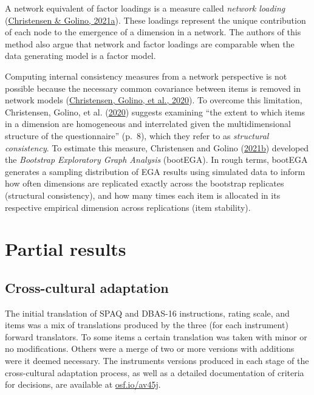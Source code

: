 \documentclass[
  ,doc,11pt, twoside,floatsintext]{apa6}
\begin{document}
A network equivalent of factor loadings is a measure called \emph{network loading} (\protect\hyperlink{ref-christensen2021}{Christensen \& Golino, 2021a}). These loadings represent the unique contribution of each node to the emergence of a dimension in a network. The authors of this method also argue that network and factor loadings are comparable when the data generating model is a factor model.

Computing internal consistency measures from a network perspective is not possible because the necessary common covariance between items is removed in network models (\protect\hyperlink{ref-christensen2020b}{Christensen, Golino, et al., 2020}). To overcome this limitation, Christensen, Golino, et al. (\protect\hyperlink{ref-christensen2020b}{2020}) suggests examining ``the extent to which items in a dimension are homogeneous and interrelated given the multidimensional structure of the questionnaire'' (p.~8), which they refer to as \emph{structural consistency}. To estimate this measure, Christensen and Golino (\protect\hyperlink{ref-christensen2021a}{2021b}) developed the \emph{Bootstrap Exploratory Graph Analysis} (bootEGA). In rough terms, bootEGA generates a sampling distribution of EGA results using simulated data to inform how often dimensions are replicated exactly across the bootstrap replicates (structural consistency), and how many times each item is allocated in its respective empirical dimension across replications (item stability).

\newpage

\hypertarget{partial-results}{%
\section{Partial results}\label{partial-results}}

\hypertarget{cross-cultural-adaptation}{%
\subsection{Cross-cultural adaptation}\label{cross-cultural-adaptation}}

The initial translation of SPAQ and DBAS-16 instructions, rating scale, and items was a mix of translations produced by the three (for each instrument) forward translators. To some items a certain translation was taken with minor or no modifications. Others were a merge of two or more versions with additions were it deemed necessary. The instruments versions produced in each stage of the cross-cultural adaptation process, as well as a detailed documentation of criteria for decisions, are available at \href{https://osf.io/av45j/}{osf.io/av45j}.
\end{document}
